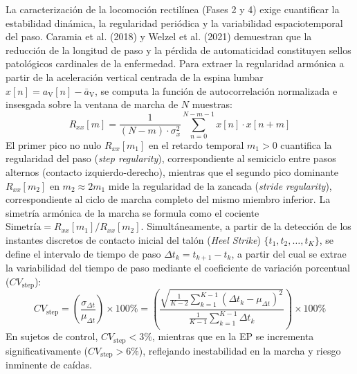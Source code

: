 \documentclass[12pt,a4paper]{article}
\begin{document}
La caracterización de la locomoción rectilínea (Fases 2 y 4) exige cuantificar la estabilidad dinámica, la regularidad periódica y la variabilidad espaciotemporal del paso. Caramia et al. (2018) y Welzel et al. (2021) demuestran que la reducción de la longitud de paso y la pérdida de automaticidad constituyen sellos patológicos cardinales de la enfermedad. Para extraer la regularidad armónica a partir de la aceleración vertical centrada de la espina lumbar $x[n] = a_{\text{V}}[n] - \bar{a}_{\text{V}}$, se computa la función de autocorrelación normalizada e insesgada sobre la ventana de marcha de $N$ muestras:
\[
R_{xx}[m] = \frac{1}{(N - m) \cdot \sigma_x^2} \sum_{n=0}^{N - m - 1} x[n] \cdot x[n + m]
\]
El primer pico no nulo $R_{xx}[m_1]$ en el retardo temporal $m_1 > 0$ cuantifica la regularidad del paso (\emph{step regularity}), correspondiente al semiciclo entre pasos alternos (contacto izquierdo-derecho), mientras que el segundo pico dominante $R_{xx}[m_2]$ en $m_2 \approx 2m_1$ mide la regularidad de la zancada (\emph{stride regularity}), correspondiente al ciclo de marcha completo del mismo miembro inferior. La simetría armónica de la marcha se formula como el cociente $\text{Simetría} = R_{xx}[m_1] / R_{xx}[m_2]$. Simultáneamente, a partir de la detección de los instantes discretos de contacto inicial del talón (\emph{Heel Strike}) $\{t_1, t_2, \dots, t_K\}$, se define el intervalo de tiempo de paso $\Delta t_k = t_{k+1} - t_k$, a partir del cual se extrae la variabilidad del tiempo de paso mediante el coeficiente de variación porcentual ($CV_{\text{step}}$):
\[
CV_{\text{step}} = \left( \frac{\sigma_{\Delta t}}{\mu_{\Delta t}} \right) \times 100\% = \left( \frac{\sqrt{\frac{1}{K-2}\sum_{k=1}^{K-1} (\Delta t_k - \mu_{\Delta t})^2}}{\frac{1}{K-1}\sum_{k=1}^{K-1} \Delta t_k} \right) \times 100\%
\]
En sujetos de control, $CV_{\text{step}} < 3\%$, mientras que en la EP se incrementa significativamente ($CV_{\text{step}} > 6\%$), reflejando inestabilidad en la marcha y riesgo inminente de caídas.
\end{document}
